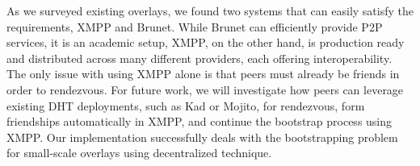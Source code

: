 \documentclass[conference]{IEEEtran}
\begin{document}
As we surveyed existing overlays, we found two systems that can easily satisfy
the requirements, XMPP and Brunet.  While Brunet can efficiently provide P2P
services, it is an academic setup, XMPP, on the other hand, is production ready
and distributed across many different providers, each offering
interoperability.  The only issue with using XMPP alone is that peers must
already be friends in order to rendezvous.  For future work, we will
investigate how peers can leverage existing DHT deployments, such as Kad or
Mojito, for rendezvous, form friendships automatically in XMPP, and continue
the bootstrap process using XMPP.  Our implementation successfully deals with
the bootstrapping problem for small-scale overlays using decentralized
technique.




\suppressfloats
\end{document}
